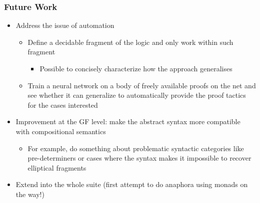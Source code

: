 \documentclass[11pt]{beamer}
\begin{document}
\begin{frame}[fragile]
	\frametitle{Future Work}
	
	\begin{itemize}
		
		\item Address the issue of
		automation
		
			\begin{itemize}
				
				\item Define a decidable fragment of
				the logic and only work within such fragment
		
	\begin{itemize}
		
		\item Possible to concisely characterize how the approach generalises

\end{itemize}


\item Train a neural network on a body of freely available proofs on the net and see whether it can generalize to automatically provide the proof tactics for the cases interested




\end{itemize}


\item Improvement at the GF level: make the abstract syntax more compatible with compositional semantics

	
	\begin{itemize}
		
		\item For example, do something about problematic syntactic categories like pre-determiners or cases where the syntax makes it impossible to recover elliptical fragments


\end{itemize}

\item Extend into the whole suite (first attempt to do anaphora using monads on the way!)


\end{itemize}

\end{frame}	
\end{document}
